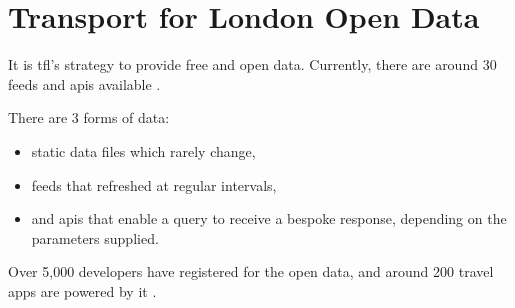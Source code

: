 \section{Transport for London Open Data}


\par It is \acrshort{tfl}'s strategy to provide free and open data. Currently, there are around 30 feeds and \acrshort{api}s available \cite{open_data}.

\par There are 3 forms of data:

\begin{itemize}
  \item static data files which rarely change,
  \item feeds that refreshed at regular intervals,
  \item and \acrshort{api}s that enable a query to receive a bespoke response, depending on the parameters supplied.
\end{itemize}

Over 5,000 developers have registered for the open data\cite{open_data}, and around 200 travel apps are powered by it \cite{tfl_annual_report_13/14}.
